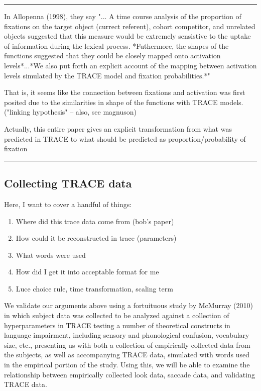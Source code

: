 \documentclass{article}
\begin{document}
\noindent\rule{2cm}{0.4pt}

In Allopenna (1998), they say "... A time course analysis of the proportion of fixations on the target object (currect referent), cohort competitor, and unrelated objects suggested that this measure would be extremely sensistive to the uptake of information during the lexical process. *Futhermore, the shapes of the functions suggested that they could be closely mapped onto activation levels*...*We also put forth an explicit account of the mapping between activation levels simulated by the TRACE model and fixation probabilities.*"

That is, it seems like the connection between fixations and activation was first posited due to the similarities in shape of the functions with TRACE models. ("linking hypothesis" -- also, see magnuson)

Actually, this entire paper gives an explicit transformation from what was predicted in TRACE to what should be predicted as proportion/probability of fixation

\noindent\rule{2cm}{0.4pt}

\subsection{Collecting TRACE data}

Here, I want to cover a handful of things:

\begin{enumerate}
\item Where did this trace data come from (bob's paper)
\item How could it be reconstructed in trace (parameters)
\item What words were used
\item How did I get it into acceptable format for me
\item Luce choice rule, time transformation, scaling term
\end{enumerate}

We validate our arguments above using a fortuituous study by McMurray (2010) in which subject data was collected to be analyzed against a collection of hyperparameters in TRACE testing a number of theoretical constructs in language impairment, including sensory and phonological confusion, vocabulary size, etc., presenting us with both a collection of empirically collected data from the subjects, as well as accompanying TRACE data, simulated with words used in the empirical portion of the study. Using this, we will be able to examine the relationship between empirically collected look data, saccade data, and validating TRACE data.
\end{document}
